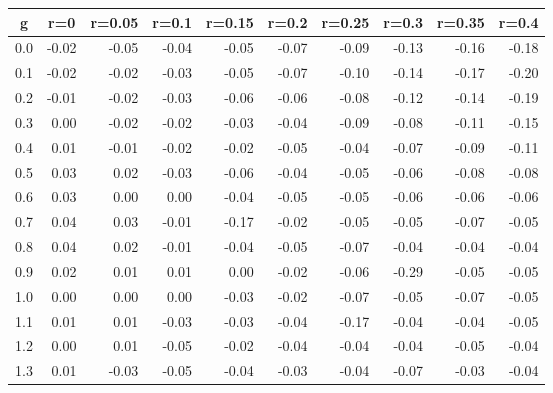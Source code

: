 %
\begin{table}[!tbp]
 \begin{center}
 \begin{tabular}{rrrrrrrrrr}\hline\hline
\multicolumn{1}{c}{g}&\multicolumn{1}{c}{r=0}&\multicolumn{1}{c}{r=0.05}&\multicolumn{1}{c}{r=0.1}&\multicolumn{1}{c}{r=0.15}&\multicolumn{1}{c}{r=0.2}&\multicolumn{1}{c}{r=0.25}&\multicolumn{1}{c}{r=0.3}&\multicolumn{1}{c}{r=0.35}&\multicolumn{1}{c}{r=0.4}\tabularnewline
\hline
0.0&-0.02&-0.05&-0.04&-0.05&-0.07&-0.09&-0.13&-0.16&-0.18\tabularnewline
0.1&-0.02&-0.02&-0.03&-0.05&-0.07&-0.10&-0.14&-0.17&-0.20\tabularnewline
0.2&-0.01&-0.02&-0.03&-0.06&-0.06&-0.08&-0.12&-0.14&-0.19\tabularnewline
0.3& 0.00&-0.02&-0.02&-0.03&-0.04&-0.09&-0.08&-0.11&-0.15\tabularnewline
0.4& 0.01&-0.01&-0.02&-0.02&-0.05&-0.04&-0.07&-0.09&-0.11\tabularnewline
0.5& 0.03& 0.02&-0.03&-0.06&-0.04&-0.05&-0.06&-0.08&-0.08\tabularnewline
0.6& 0.03& 0.00& 0.00&-0.04&-0.05&-0.05&-0.06&-0.06&-0.06\tabularnewline
0.7& 0.04& 0.03&-0.01&-0.17&-0.02&-0.05&-0.05&-0.07&-0.05\tabularnewline
0.8& 0.04& 0.02&-0.01&-0.04&-0.05&-0.07&-0.04&-0.04&-0.04\tabularnewline
0.9& 0.02& 0.01& 0.01& 0.00&-0.02&-0.06&-0.29&-0.05&-0.05\tabularnewline
1.0& 0.00& 0.00& 0.00&-0.03&-0.02&-0.07&-0.05&-0.07&-0.05\tabularnewline
1.1& 0.01& 0.01&-0.03&-0.03&-0.04&-0.17&-0.04&-0.04&-0.05\tabularnewline
1.2& 0.00& 0.01&-0.05&-0.02&-0.04&-0.04&-0.04&-0.05&-0.04\tabularnewline
1.3& 0.01&-0.03&-0.05&-0.04&-0.03&-0.04&-0.07&-0.03&-0.04\tabularnewline
\hline
\end{tabular}

\end{center}

\end{table}

